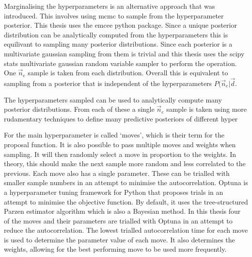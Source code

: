 Marginalising the hyperparameters is an alternative approach that was introduced. This involves using \gls{mcmc} to sample from the hyperparameter posterior. This thesis uses the emcee python package. Since a unique posterior distribution can be analytically computed from the hyperparameters this is equilivant to sampling many posterior distributions. Since each posterior is a multivariate gaussian sampling from them is trivial and this thesis uses the scipy stats multivariate gaussian random variable sampler to perform the operation. One $\vec n_e$ sample is taken from each distribution. Overall this is equivalent to sampling from a posterior that is independent of the hyperparameters $P(\vec n_e | \vec d$.


The hyperparameters sampled can be used to analytically compute many posterior distributions. From each of these a single $\vec n_e$ sample is taken using more rudamentary techniques to define many predictive posteriors of different hyper

For the main hyperparameter is called `moves', which is their term for the proposal function. It is also possible to pass multiple moves and weights when sampling. It will then randomly select a move in proportion to the weights. In theory, this should make the next sample more random and less correlated to the previous. Each move also has a single parameter. These can be trialled with smaller sample numbers in an attempt to minimise the autocorrelation. Optuna is a hyperparameter tuning framework for Python that proposes trials in an attempt to minimise the objective function. By default, it uses the tree-structured Parzen estimator algorithm which is also a Bayesian method. In this thesis four of the moves and their parameters are trialled with Optuna in an attempt to reduce the autocorrelation. The lowest trialled autocorrelation time for each move is used to determine the parameter value of each move. It also determines the weights, allowing for the best performing move to be used more frequently.


